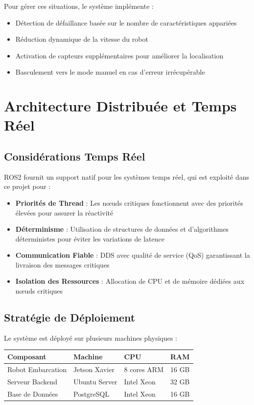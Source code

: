 \documentclass[12pt,a4paper,oneside]{report}
\begin{document}
Pour gérer ces situations, le système implémente :

\begin{itemize}
  \item Détection de défaillance basée sur le nombre de caractéristiques appariées
  \item Réduction dynamique de la vitesse du robot
  \item Activation de capteurs supplémentaires pour améliorer la localisation
  \item Basculement vers le mode manuel en cas d'erreur irrécupérable
\end{itemize}

\section{Architecture Distribuée et Temps Réel}

\subsection{Considérations Temps Réel}

ROS2 fournit un support natif pour les systèmes temps réel, qui est exploité dans ce projet pour :

\begin{itemize}
  \item \textbf{Priorités de Thread} : Les nœuds critiques fonctionnent avec des priorités élevées pour assurer la réactivité
  \item \textbf{Déterminisme} : Utilisation de structures de données et d'algorithmes déterministes pour éviter les variations de latence
  \item \textbf{Communication Fiable} : DDS avec qualité de service (QoS) garantissant la livraison des messages critiques
  \item \textbf{Isolation des Ressources} : Allocation de CPU et de mémoire dédiées aux nœuds critiques
\end{itemize}

\subsection{Stratégie de Déploiement}

Le système est déployé sur plusieurs machines physiques :

\begin{table}[H]
\centering
\begin{tabular}{|l|l|l|l|}
\hline
\textbf{Composant} & \textbf{Machine} & \textbf{CPU} & \textbf{RAM} \\
\hline
Robot Embarcation & Jetson Xavier & 8 cores ARM & 16 GB \\
Serveur Backend & Ubuntu Server & Intel Xeon & 32 GB \\
Base de Données & PostgreSQL & Intel Xeon & 16 GB \\
\hline
\end{tabular}
\end{table}
\end{document}
